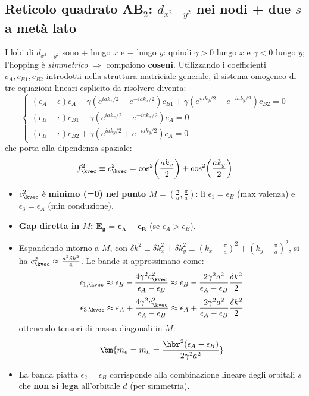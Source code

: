 \subsection{Reticolo quadrato AB$_2$: $d_{x^2-y^2}$ nei nodi + due $s$ a metà lato}
I lobi di $d_{x^2-y^2}$ sono $+$ lungo $x$ e $-$ lungo $y$: quindi $\gamma>0$ lungo $x$ e $\gamma<0$ lungo $y$; l'hopping è \emph{simmetrico} $\Rightarrow$ compaiono \textbf{coseni}.
Utilizzando i coefficienti $c_A, c_{B1}, c_{B2}$ introdotti nella struttura matriciale generale, il sistema omogeneo di tre equazioni lineari esplicito da risolvere diventa:
\[
\begin{cases}
(\epsilon_A - \epsilon)c_A - \gamma\left(e^{i a k_x/2} + e^{-i a k_x/2}\right)c_{B1} + \gamma\left(e^{i a k_y/2} + e^{-i a k_y/2}\right)c_{B2} = 0 \\
(\epsilon_B - \epsilon)c_{B1} - \gamma\left(e^{i a k_x/2} + e^{-i a k_x/2}\right)c_A = 0 \\
(\epsilon_B - \epsilon)c_{B2} + \gamma\left(e^{i a k_y/2} + e^{-i a k_y/2}\right)c_A = 0
\end{cases}
\]
che porta alla dipendenza spaziale:
\[ f_\kvec^2 \equiv c_\kvec^2 = \cos^2\!\left(\frac{ak_x}{2}\right)+\cos^2\!\left(\frac{ak_y}{2}\right) \]
\begin{itemize}
  \item $c_\kvec^2$ è \textbf{minimo (=0) nel punto $M=\left(\frac\pi a,\frac\pi a\right)$}: lì $\epsilon_1 = \epsilon_B$ (max valenza) e $\epsilon_3=\epsilon_A$ (min conduzione).
  \item \textbf{Gap diretta in $M$:} $\bm{E_g = \epsilon_A-\epsilon_B}$ (se $\epsilon_A>\epsilon_B$).
  \item Espandendo intorno a $M$, con $\delta k^2 \equiv \delta k_x^2 + \delta k_y^2 \equiv \left(k_x - \frac{\pi}{a}\right)^2 + \left(k_y - \frac{\pi}{a}\right)^2$, si ha $c_\kvec^2\approx\frac{a^2\delta k^2}{4}$. Le bande si approssimano come:
  \[ \epsilon_{1,\kvec} \approx \epsilon_B - \frac{4\gamma^2 c_\kvec^2}{\epsilon_A - \epsilon_B} \approx \epsilon_B - \frac{2\gamma^2a^2}{\epsilon_A - \epsilon_B}\frac{\delta k^2}{2} \]
  \[ \epsilon_{3,\kvec} \approx \epsilon_A + \frac{4\gamma^2 c_\kvec^2}{\epsilon_A - \epsilon_B} \approx \epsilon_A + \frac{2\gamma^2a^2}{\epsilon_A - \epsilon_B}\frac{\delta k^2}{2} \]
  ottenendo tensori di massa diagonali in $M$:
  \[ \bm{m_e = m_h = \frac{\hbr^2(\epsilon_A-\epsilon_B)}{2\gamma^2 a^2}} \]
  \item La banda piatta $\epsilon_2 = \epsilon_B$ corrisponde alla combinazione lineare degli orbitali $s$ che \textbf{non si lega} all'orbitale $d$ (per simmetria).
\end{itemize}


